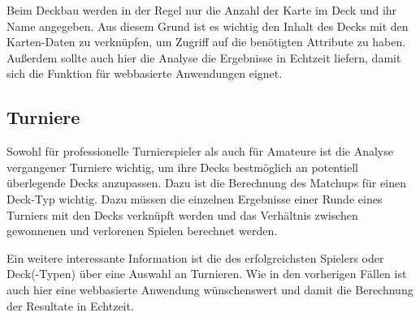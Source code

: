 Beim Deckbau werden in der Regel nur die Anzahl der Karte im Deck und ihr Name angegeben. Aus diesem Grund ist es wichtig den Inhalt des Decks mit den Karten-Daten zu verknüpfen, um Zugriff auf die benötigten Attribute zu haben. Außerdem sollte auch hier die Analyse die Ergebnisse in Echtzeit liefern, damit sich die Funktion für webbasierte Anwendungen eignet.

\subsection{Turniere}
Sowohl für professionelle Turnierspieler als auch für Amateure ist die Analyse vergangener Turniere wichtig, um ihre Decks bestmöglich an potentiell überlegende Decks anzupassen. Dazu ist die Berechnung des Matchups für einen Deck-Typ wichtig. Dazu müssen die einzelnen Ergebnisse einer Runde eines Turniers mit den Decks verknüpft werden und das Verhältnis zwischen gewonnenen und verlorenen Spielen berechnet werden.

Ein weitere interessante Information ist die des erfolgreichsten Spielers oder Deck(-Typen) über eine Auswahl an Turnieren. Wie in den vorherigen Fällen ist auch hier eine webbasierte Anwendung wünschenswert und damit die Berechnung der Resultate in Echtzeit.